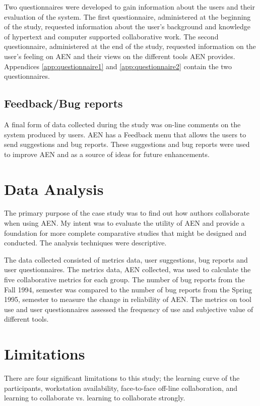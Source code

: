 Two questionnaires were developed to gain information about the users and
their evaluation of the system.  The first questionnaire, administered at
the beginning of the study, requested information about the user's
background and knowledge of hypertext and computer supported collaborative
work.  The second questionnaire, administered at the end of the study,
requested information on the user's feeling on AEN and their views on the
different tools AEN provides. Appendices \ref{app:questionnaire1} and
\ref{app:questionnaire2} contain the two questionnaires.

\subsection{Feedback/Bug reports}

A final form of data collected during the study was on-line comments on the
system produced by users.  AEN has a Feedback menu that allows the users to
send suggestions and bug reports.  These suggestions and bug reports were
used to improve AEN and as a source of ideas for future enhancements.

\section{Data Analysis}
\label{sec:dataanalysis}

The primary purpose of the case study was to find out how authors
collaborate when using AEN.  My intent was to evaluate the utility of AEN
and provide a foundation for more complete comparative studies that might be
designed and conducted.  The analysis techniques were descriptive.

The data collected consisted of metrics data, user suggestions, bug reports
and user questionnaires.  The metrics data, AEN collected, was used to
calculate the five collaborative metrics for each group.  The number of bug
reports from the Fall 1994, semester was compared to the number of bug
reports from the Spring 1995, semester to measure the change in reliability
of AEN.  The metrics on tool use and user questionnaires assessed the
frequency of use and subjective value of different tools.

\section{Limitations}
\label{sec:limitations}
There are four significant limitations to this study; the learning curve of
the participants, workstation availability, face-to-face off-line
collaboration, and learning to collaborate vs. learning to collaborate
strongly. 


